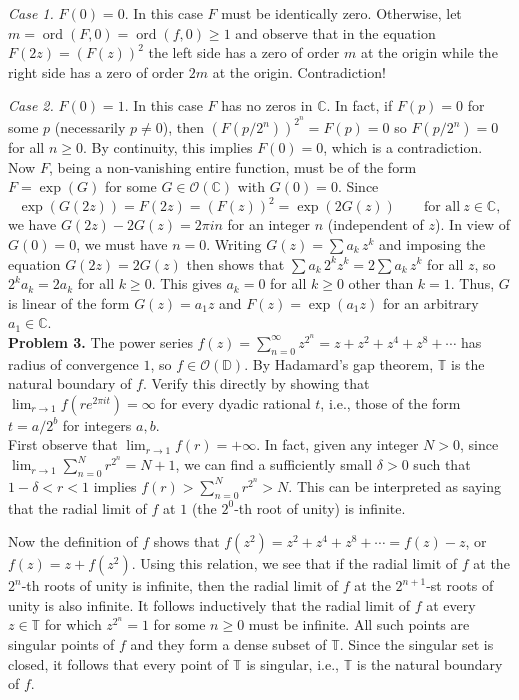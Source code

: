 \documentclass[12pt]{amsart}
\newcommand{\ord}{\operatorname{ord}}
\newcommand{\OO}{{\mathcal O}}
\newcommand{\CC}{{\mathbb C}}
\newcommand{\TT}{{\mathbb T}}
\newcommand{\DD}{{\mathbb D}}
\newcommand{\vs}{\vspace{2mm}}
\begin{document}
{\it Case 1.} $F(0)=0$. In this case $F$ must be  identically zero. Otherwise, let $m=\ord(F,0)=\ord(f,0) \geq 1$ and observe that in the equation $F(2z)=(F(z))^2$ the left side has a zero of order $m$ at the origin while the right side has a zero of order $2m$ at the origin. Contradiction! \vs

{\it Case 2.} $F(0)=1$. In this case $F$ has no zeros in $\CC$. In fact, if $F(p)=0$ for some $p$ (necessarily $p \neq 0$), then $(F(p/2^n))^{2^n}=F(p)=0$ so $F(p/2^n)=0$ for all $n \geq 0$. By continuity, this implies $F(0)=0$, which is a contradiction. Now $F$, being a non-vanishing entire function, must be of the form $F=\exp(G)$ for some $G \in \OO(\CC)$ with $G(0)=0$. Since 
$$
\exp(G(2z))=F(2z)=(F(z))^2=\exp(2G(z)) \qquad \text{for all} \ z \in \CC,
$$       
we have $G(2z)-2G(z)=2\pi i n$ for an integer $n$ (independent of $z$). In view of $G(0)=0$, we must have $n=0$. Writing $G(z)=\sum a_k \, z^k$ and imposing the equation $G(2z)=2G(z)$ then shows that $\sum a_k \, 2^k z^k = 2 \sum a_k \, z^k$ for all $z$, so $2^k a_k = 2 a_k$ for all $k \geq 0$. This gives $a_k=0$ for all $k \geq 0$ other than $k=1$. Thus, $G$ is linear of the form $G(z)=a_1z$ and $F(z)=\exp (a_1z)$ for an arbitrary $a_1 \in \CC$. \\ 

\noindent
{\bf Problem 3.} The power series $f(z)=\sum_{n=0}^{\infty} z^{2^n}=z+z^2+z^4+z^8+\cdots$ has radius of convergence $1$, so $f \in \OO(\DD)$. By Hadamard's gap theorem, $\TT$ is the natural boundary of $f$. Verify this directly by showing that $\lim_{r \to 1} f(re^{2\pi i t})=\infty$ for every dyadic rational $t$, i.e., those of the form $t=a/2^b$ for integers $a,b$. \vs \\
First observe that $\lim_{r \to 1} f(r)=+\infty$. In fact, given any integer $N>0$, since $\lim_{r \to 1} \sum_{n=0}^N r^{2^n} = N+1$, we can find a sufficiently small $\delta>0$ such that $1-\delta<r<1$ implies $f(r)>\sum_{n=0}^N r^{2^n}>N$. This can be interpreted as saying that the radial limit of $f$ at $1$ (the $2^0$-th root of unity) is infinite. \vs 

Now the definition of $f$ shows that $f(     z^2)=z^2+z^4+z^8+\cdots=f(z)-z$, or $f(z)=z+f(z^2)$. Using this relation, we see that  if the radial limit of $f$ at the $2^n$-th roots of unity is infinite, then the radial limit of $f$ at the $2^{n+1}$-st roots of unity is also infinite. It follows inductively that the radial limit of $f$ at every $z \in \TT$ for which $z^{2^n}=1$ for some $n \geq 0$ must be infinite. All such points are singular points of $f$ and they form a dense subset of $\TT$. Since the singular set is closed, it follows that every point of $\TT$ is singular, i.e., $\TT$ is the natural boundary of $f$. \\ 
\end{document}
